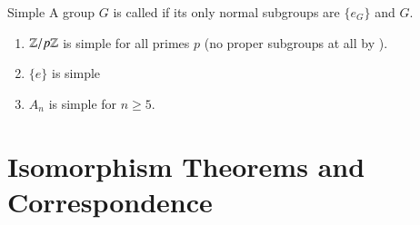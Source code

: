 \documentclass[12pt, a4paper, twoside, openright, titlepage]{book}
\begin{document}
\begin{defn}{Simple}{}
        A group $G$ is called  if its only normal subgroups are $\{e_G\}$ and $G$.
\end{defn}

\begin{eg}{}{}
        \leavevmode
        \begin{enumerate}
                \item $\mathbb Z/p\mathbb Z$ is simple for all primes $p$ (no proper subgroups at all by ).
                \item $\{e\}$ is simple
                \item $A_n$ is simple for $n \geq 5$.
        \end{enumerate}
\end{eg}

\section{\textsection Isomorphism Theorems and Correspondence}
\end{document}
